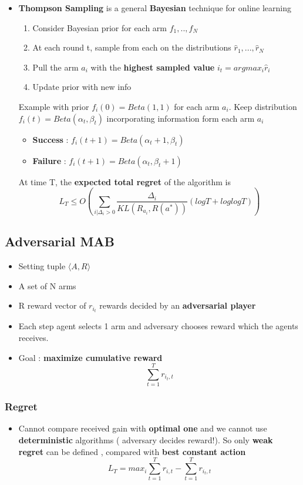 \documentclass[12pt]{article} %
\begin{document}
\begin{itemize}
\item \textbf{Thompson Sampling} is a general \textbf{Bayesian} technique for online learning
\begin{enumerate}
\item Consider Bayesian prior for each arm $f_1,..,f_N$
\item At each round t, sample from each on the distributions $\hat{r}_1,...,\hat{r}_N$
\item Pull the arm $a_i$ with the \textbf{highest sampled value} $i_t= argmax_i \hat{r}_i$
\item Update prior with new info
\end{enumerate}
Example with prior $f_i(0)=Beta(1,1)$ for each arm $a_i$. Keep distribution $f_i(t)=Beta(\alpha_t,\beta_t)$ incorporating information form each arm $a_i$
\begin{itemize}
\item \textbf{Success}  : $f_i(t+1)=Beta(\alpha_t+1,\beta_t)$
\item \textbf{Failure}  : $f_i(t+1)=Beta(\alpha_t,\beta_t+1)$
\end{itemize}
At time T, the \textbf{expected total regret} of the algorithm is
$$ L_T \leq O\left(  \sum_{i|\Delta_i > 0} \frac{\Delta_i}{KL(R_{a_i},R(a^*))}(log T + log log T)\right)$$
\end{itemize}

\subsection{Adversarial MAB}
\begin{itemize}
\item Setting tuple $\langle A,R \rangle$
\item A set of N arms
\item R reward vector of $r_{i_t}$ rewards decided by an \textbf{adversarial player}\item Each step agent selects 1 arm and adversary chooses reward which the agents receives.
\item Goal : \textbf{maximize cumulative reward} 
$$ \sum_{t=1}^T r_{i_t,t}$$
\end{itemize}

\subsubsection{Regret}
\begin{itemize}
\item Cannot compare received gain with \textbf{optimal one} and we cannot use \textbf{deterministic} algorithms ( adversary decides reward!). So only \textbf{weak regret} can be defined , compared with  \textbf{best constant action}
$$ L_T  = max_i\sum_{t=1}^T r_{i,t} - \sum_{t=1}^T r_{i_t,t} $$
\end{itemize}
\end{document}
